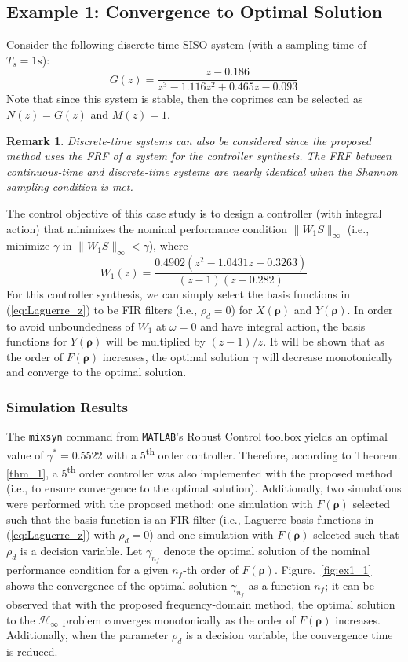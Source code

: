 \documentclass[letterpaper, 10 pt, conference]{ieeeconf}  %
\newtheorem*{remark*}{Remark}
\begin{document}
\subsection{Example 1: Convergence to Optimal Solution}
Consider the following discrete time SISO system (with a sampling time of $T_s = 1s$):
\begin{equation}
G(z) = \frac{z-0.186}{z^3 - 1.116z^2 + 0.465z-0.093}
\end{equation}
Note that since this system is stable, then the coprimes can be selected as $N(z) = G(z)$ and $M(z) = 1$. 
\begin{remark*}
Discrete-time systems can also be considered since the proposed method uses the FRF of a system for the controller synthesis. The FRF between continuous-time and discrete-time systems are nearly identical when the Shannon sampling condition is met.
\end{remark*}
The control objective of this case study is to design a controller (with integral action) that minimizes the nominal performance condition $\|W_1S \|_{\infty}$ (i.e., minimize $\gamma$ in $\|W_1S \|_{\infty} < \gamma$), where
\begin{equation}
W_1(z) = \frac{0.4902(z^2-1.0431z+0.3263)}{(z-1)(z-0.282)}
\end{equation}
For this controller synthesis, we can simply select the basis functions in (\ref{eq:Laguerre_z}) to be FIR filters (i.e., $\rho_d = 0$) for $X(\bm{\rho})$ and $Y(\bm{\rho})$. In order to avoid unboundedness of $W_1$ at $\omega = 0$ and have integral action, the basis functions for $Y(\bm{\rho})$ will be multiplied by $(z-1)/z$. It will be shown that as the order of $F(\bm{\rho})$ increases, the optimal solution $\gamma$ will decrease monotonically and converge to the optimal solution. 

\subsubsection{Simulation Results}
The \texttt{mixsyn} command from \texttt{MATLAB}'s Robust Control toolbox yields an optimal value of $\gamma^* = 0.5522$ with a 5\textsuperscript{th} order controller. Therefore, according to Theorem.\ref{thm_1}, a 5\textsuperscript{th} order controller was also implemented with the proposed method (i.e., to ensure convergence to the optimal solution). Additionally, two simulations were performed with the proposed method; one simulation with $F(\bm{\rho})$ selected such that the basis function is an FIR filter (i.e., Laguerre basis functions in (\ref{eq:Laguerre_z}) with $\rho_d = 0$) and one simulation with $F(\bm{\rho})$ selected such that $\rho_d$ is a decision variable.  Let $\gamma_{n_f}$ denote the optimal solution of the nominal performance condition for a given $n_f$-th order of $F(\bm{\rho})$. Figure.~\ref{fig:ex1_1} shows the convergence of the optimal solution $\gamma_{n_f}$ as a function $n_f$; it can be observed that with the proposed frequency-domain method, the optimal solution to the $\mathcal{H}_{\infty}$ problem converges monotonically as the order of $F(\bm{\rho})$ increases. Additionally, when the parameter $\rho_d$ is a decision variable, the convergence time is reduced. 
\end{document}
